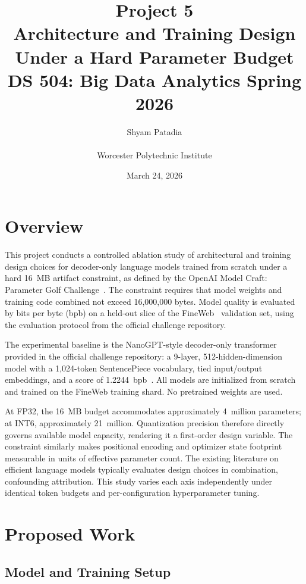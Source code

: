 \documentclass[12pt, letterpaper]{article}
\title{
    \textbf{Project 5} \\[0.4em]
    \large Architecture and Training Design Under a Hard Parameter Budget \\[0.4em]
    \normalsize DS 504: Big Data Analytics \textendash{} Spring 2026
}
\author{Shyam Patadia \\ \\ Worcester Polytechnic Institute}
\date{March 24, 2026}
\begin{document}
\maketitle
\thispagestyle{empty}

\section{Overview}

This project conducts a controlled ablation study of architectural
and training design choices for decoder-only language models
trained from scratch under a hard 16~MB artifact constraint,
as defined by the OpenAI Model Craft: Parameter Golf
Challenge~\cite{paramgolf2026}. The constraint requires that
model weights and training code combined not exceed 16,000,000
bytes. Model quality is evaluated by bits per byte (bpb) on
a held-out slice of the FineWeb~\cite{fineweb2024} validation
set, using the evaluation protocol from the official challenge
repository.

The experimental baseline is the NanoGPT-style decoder-only
transformer provided in the official challenge repository:
a 9-layer, 512-hidden-dimension model with a 1,024-token
SentencePiece vocabulary, tied input/output embeddings, and a
score of 1.2244~bpb~\cite{paramgolf2026}. All models are
initialized from scratch and trained on the FineWeb training
shard. No pretrained weights are used.

At FP32, the 16~MB budget accommodates approximately 4~million
parameters; at INT6, approximately 21~million. Quantization
precision therefore directly governs available model capacity,
rendering it a first-order design variable. The constraint
similarly makes positional encoding and optimizer state
footprint measurable in units of effective parameter count.
The existing literature on efficient language models typically
evaluates design choices in combination, confounding
attribution. This study varies each axis independently under
identical token budgets and per-configuration hyperparameter
tuning.

\section{Proposed Work}

\subsection{Model and Training Setup}
\end{document}
